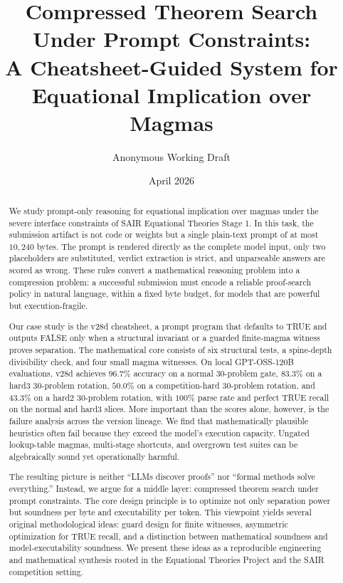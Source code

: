 \documentclass[12pt]{amsart}
\title[Compressed Theorem Search]{Compressed Theorem Search Under Prompt Constraints:\\A Cheatsheet-Guided System for Equational Implication over Magmas}
\author{Anonymous Working Draft}
\date{April 2026}
\begin{document}
\begin{abstract}
We study prompt-only reasoning for equational implication over magmas under the severe interface constraints of SAIR Equational Theories Stage 1. In this task, the submission artifact is not code or weights but a single plain-text prompt of at most $10{,}240$ bytes. The prompt is rendered directly as the complete model input, only two placeholders are substituted, verdict extraction is strict, and unparseable answers are scored as wrong. These rules convert a mathematical reasoning problem into a compression problem: a successful submission must encode a reliable proof-search policy in natural language, within a fixed byte budget, for models that are powerful but execution-fragile.

Our case study is the v28d cheatsheet, a prompt program that defaults to TRUE and outputs FALSE only when a structural invariant or a guarded finite-magma witness proves separation. The mathematical core consists of six structural tests, a spine-depth divisibility check, and four small magma witnesses. On local GPT-OSS-120B evaluations, v28d achieves $96.7\%$ accuracy on a normal $30$-problem gate, $83.3\%$ on a hard3 $30$-problem rotation, $50.0\%$ on a competition-hard $30$-problem rotation, and $43.3\%$ on a hard2 $30$-problem rotation, with $100\%$ parse rate and perfect TRUE recall on the normal and hard3 slices. More important than the scores alone, however, is the failure analysis across the version lineage. We find that mathematically plausible heuristics often fail because they exceed the model's execution capacity. Ungated lookup-table magmas, multi-stage shortcuts, and overgrown test suites can be algebraically sound yet operationally harmful.

The resulting picture is neither ``LLMs discover proofs'' nor ``formal methods solve everything.'' Instead, we argue for a middle layer: compressed theorem search under prompt constraints. The core design principle is to optimize not only separation power but soundness per byte and executability per token. This viewpoint yields several original methodological ideas: guard design for finite witnesses, asymmetric optimization for TRUE recall, and a distinction between mathematical soundness and model-executability soundness. We present these ideas as a reproducible engineering and mathematical synthesis rooted in the Equational Theories Project and the SAIR competition setting.
\end{abstract}

\maketitle
\end{document}
